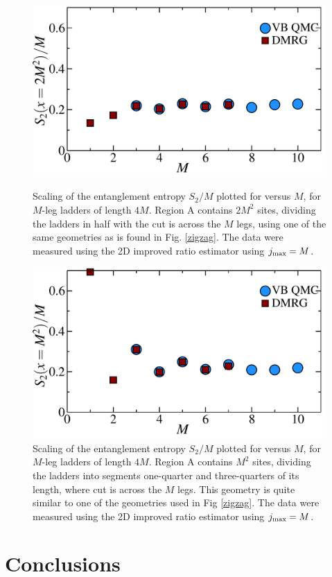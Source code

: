 \begin{figure} {
	\vspace{-1cm}
	\hspace{1cm}
	\includegraphics[width=5in]{./figures/made/awesomeplot/marea2.pdf} 
	\caption[Entanglement entropy $S_2/M$ vs. $M$ for $M$-leg ladders of length $4M$ cut in half]{ 
Scaling of the entanglement entropy $S_2/M$ plotted for versus $M$, for $M$-leg ladders of length $4M$.  
Region A contains $2M^2$ sites, dividing the ladders in half with the cut is across the $M$ legs, using one of the same geometries as is found in Fig. \ref{zigzag}.
The data were measured using the 2D improved ratio estimator using $j_{\rm max} = M$.
	\label{2Dbetter1}
	}
\vspace{1cm}
\hspace{1cm}
	\includegraphics[width=5in]{./figures/made/awesomeplot/marea.pdf} 
	\caption[Entanglement entropy $S_2/M$ vs. $M$ for $M$-leg ladders of length $4M$ with a different cut]{ 
	Scaling of the entanglement entropy $S_2/M$ plotted for versus $M$, for $M$-leg ladders of length $4M$.  
Region A contains $M^2$ sites, dividing the ladders into segments one-quarter and three-quarters of its length, where cut is across the $M$ legs.  This geometry is quite similar to one of the geometries used in Fig \ref{zigzag}.
The data were measured using the 2D improved ratio estimator using $j_{\rm max} = M$.
		\label{2Dbetter2}
	}

} \end{figure}

\section{Conclusions}
